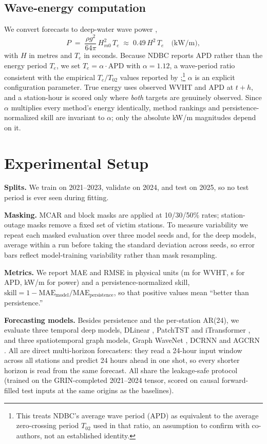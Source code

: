\documentclass[11pt]{article}
\begin{document}
\subsection{Wave-energy computation}
We convert forecasts to deep-water wave power \citep{guillou2020},
\begin{equation}
P \;=\; \frac{\rho g^{2}}{64\pi}\, H_{m0}^{2}\, T_e \;\approx\; 0.49\, H^{2}\, T_e
\quad \text{(kW/m)},
\label{eq:power}
\end{equation}
with $H$ in metres and $T_e$ in seconds. Because NDBC reports APD rather than the
energy period $T_e$, we set $T_e = \alpha \cdot \text{APD}$ with $\alpha = 1.12$,
a wave-period ratio consistent with the empirical $T_e/T_{02}$ values reported by
\citet{cahill2014};\footnote{This treats NDBC's average wave period (APD) as
equivalent to the average zero-crossing period $T_{02}$ used in that ratio, an
assumption to confirm with co-authors, not an established identity.} $\alpha$ is
an explicit configuration parameter. True energy uses observed WVHT and APD at
$t+h$, and a station-hour is scored only where \emph{both} targets are genuinely
observed. Since $\alpha$ multiplies every method's energy identically, method
rankings and persistence-normalized skill are invariant to $\alpha$; only the
absolute kW/m magnitudes depend on it.

\section{Experimental Setup}
\label{sec:setup}
\textbf{Splits.} We train on 2021--2023, validate on 2024, and test on 2025, so
no test period is ever seen during fitting.

\noindent\textbf{Masking.} MCAR and block masks are applied at 10/30/50\% rates;
station-outage masks remove a fixed set of victim stations. To measure
variability we repeat each masked evaluation over three model seeds and, for the
deep models, average within a run before taking the standard deviation across
seeds, so error bars reflect model-training variability rather than mask
resampling.

\noindent\textbf{Metrics.} We report MAE and RMSE in physical units (m for WVHT,
s for APD, kW/m for power) and a persistence-normalized skill,
$\text{skill} = 1 - \text{MAE}_{\text{model}}/\text{MAE}_{\text{persistence}}$,
so that positive values mean ``better than persistence.''

\noindent\textbf{Forecasting models.} Besides persistence and the per-station
AR(24), we evaluate three temporal deep models, DLinear \citep{dlinear2023},
PatchTST \citep{patchtst2023} and iTransformer \citep{itransformer2024}, and three
spatiotemporal graph models, Graph WaveNet \citep{gwn}, DCRNN \citep{dcrnn} and
AGCRN \citep{agcrn2020}. All are direct multi-horizon forecasters: they read a
24-hour input window across all stations and predict 24 hours ahead in one shot, so
every shorter horizon is read from the same forecast. All share the leakage-safe
protocol (trained on the GRIN-completed 2021--2024 tensor, scored on causal
forward-filled test inputs at the same origins as the baselines).
\end{document}
